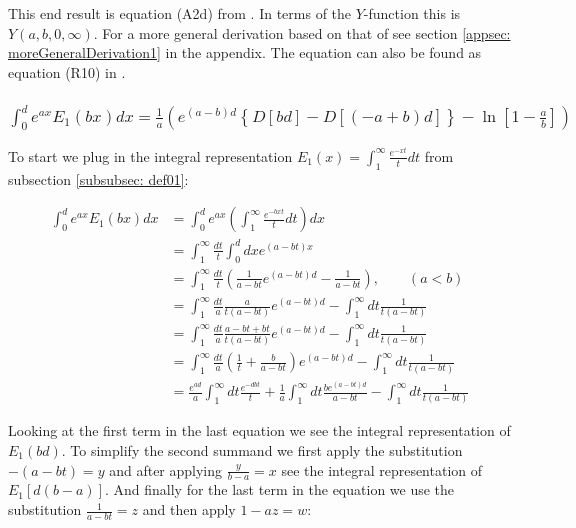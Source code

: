 \documentclass[bibliography=totocnumbered]{scrartcl}
\newcommand{\assume}[1][\text{MISSING PARAMETER}]{,\qquad\left(#1\right)}
\begin{document}
	This end result is equation (A2d) from \cite{boer1990calc}. In terms of the $Y$-function this is $Y\left(a,b,0,\infty\right)$. For a more general derivation based on that of \autocite[73\psq]{schloemilch} see section \ref{appsec: moreGeneralDerivation1} in the appendix. The equation can also be found as equation (R10) in \cite{sherman}.

	\subsubsection[A integral of E1(x), involving the exponential function]{$\int_{0}^{d}e^{ax}E_1\left(bx\right)dx=\frac{1}{a}\left(e^{\left(a-b\right)d}\left\{D\left[bd\right]-D\left[\left(-a+b\right)d\right]\right\}-\ln{\left[1-\frac{a}{b}\right]}\right)$}
	\label{subsubsec: generalIntegralOfE4}

	To start we plug in the integral representation $E_1\left(x\right)=\int_{1}^{\infty}\frac{e^{-xt}}{t}dt$ from subsection \ref{subsubsec: def01}:

	\begin{align}
		\int_{0}^{d}e^{ax}E_1\left(bx\right)dx&=\int_{0}^{d}e^{ax}\left(\int_{1}^{\infty}\frac{e^{-bxt}}{t}dt\right)dx\\
		&=\int_{1}^{\infty}\frac{dt}{t}\int_{0}^{d}dxe^{\left(a-bt\right)x}\\
		&=\int_{1}^{\infty}\frac{dt}{t}\left(\frac{1}{a-bt}e^{\left(a-bt\right)d}-\frac{1}{a-bt}\right)\assume[a<b]\\
		&=\int_{1}^{\infty}\frac{dt}{a}\frac{a}{t\left(a-bt\right)}e^{\left(a-bt\right)d}-\int_{1}^{\infty}dt\frac{1}{t\left(a-bt\right)}\\
		&=\int_{1}^{\infty}\frac{dt}{a}\frac{a-bt+bt}{t\left(a-bt\right)}e^{\left(a-bt\right)d}-\int_{1}^{\infty}dt\frac{1}{t\left(a-bt\right)}\\
		&=\int_{1}^{\infty}\frac{dt}{a}\left(\frac{1}{t}+\frac{b}{a-bt}\right)e^{\left(a-bt\right)d}-\int_{1}^{\infty}dt\frac{1}{t\left(a-bt\right)}\\
		&=\frac{e^{ad}}{a}\int_{1}^{\infty}dt\frac{e^{-dbt}}{t}+\frac{1}{a}\int_{1}^{\infty}dt\frac{be^{\left(a-bt\right)d}}{a-bt}-\int_{1}^{\infty}dt\frac{1}{t\left(a-bt\right)}
	\end{align}

	Looking at the first term in the last equation we see the integral representation of $E_1\left(bd\right)$. To simplify the second summand we first apply the substitution $-\left(a-bt\right)=y$ and after applying $\frac{y}{b-a}=x$ see the integral representation of $E_1\left[d\left(b-a\right)\right]$. And finally for the last term in the equation we use the substitution $\frac{1}{a-bt}=z$ and then apply $1-az=w$:
\end{document}

